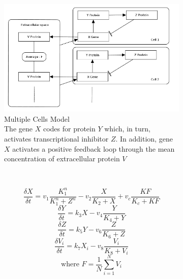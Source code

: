 \documentclass[10pt,a4paper,oneside,twocolumn]{article}
\numberwithin{equation}{section} %
\begin{document}
    \begin{figure}[!h]
	\begin{subfigure}[b]{0.5\textwidth}
	    \includegraphics[width=\textwidth]{sketch2.png}
	    \caption{
		Multiple Cells Model\\
	    The gene $X$ codes for protein $Y$ which, in turn, activates transcriptional inhibitor $Z$. In addition, gene $X$ activates a positive feedback loop through the mean concentration of extracellular protein $V$
	    }
	\end{subfigure}
	~
	\begin{subfigure}[b]{0.5\textwidth}
	    \begin{equation*}\frac{\delta X}{\delta t} = v_1 \frac{K_1^n}{K_1^n + Z^n} - v_2 \frac{X}{K_2 + X} + v_c\frac{KF}{K_c + KF}\end{equation*}
	    \begin{equation*}\frac{\delta Y}{\delta t} = k_3 X - v_4 \frac{Y}{K_4 + Y}\end{equation*}
	    \begin{equation*}\frac{\delta Z}{\delta t} = k_5 Y - v_6 \frac{Z}{K_6 + Z}\end{equation*}
	    \begin{equation*}\frac{\delta V_i}{\delta t} = k_7 X_i - v_8 \frac{V_i}{K_8 + V_i}\end{equation*}
	    \begin{equation*}\text{where } F = \frac{1}{N}\sum_{i=1}^{N}V_i\end{equation*}


\end{subfigure}
\end{figure}
\end{document}

